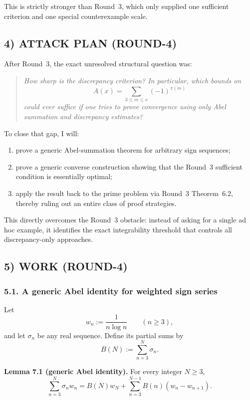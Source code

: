 This is strictly stronger than Round~3, which only supplied one sufficient criterion and one special counterexample scale.

\subsection*{4) ATTACK PLAN (ROUND-4)}

After Round~3, the exact unresolved structural question was:

\begin{quote}
\emph{How sharp is the discrepancy criterion? In particular, which bounds on}
\[
A(x)=\sum_{3\le m\le x}(-1)^{\pi(m)}
\]
\emph{could ever suffice if one tries to prove convergence using only Abel summation and discrepancy estimates?}
\end{quote}

To close that gap, I will:

\begin{enumerate}
\item prove a generic Abel-summation theorem for arbitrary sign sequences;
\item prove a generic converse construction showing that the Round~3 sufficient condition is essentially optimal;
\item apply the result back to the prime problem via Round~3 Theorem~6.2, thereby ruling out an entire class of proof strategies.
\end{enumerate}

This directly overcomes the Round~3 obstacle: instead of asking for a single ad hoc example, it identifies the exact integrability threshold that controls all discrepancy-only approaches.

\subsection*{5) WORK (ROUND-4)}

\subsubsection*{5.1. A generic Abel identity for weighted sign series}

Let
\[
w_n:=\frac{1}{n\log n}\qquad (n\ge 3),
\]
and let $\sigma_n$ be any real sequence. Define its partial sums by
\[
B(N):=\sum_{n=3}^N \sigma_n.
\]

\textbf{Lemma 7.1 (generic Abel identity).}
For every integer $N\ge 3$,
\[
\sum_{n=3}^N \sigma_n w_n
=
B(N)w_N + \sum_{n=3}^{N-1} B(n)(w_n-w_{n+1}).
\]

